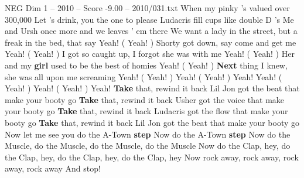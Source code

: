 \begin{textsample}{NEG Dim 1 – 2010 – Score -9.00 – 2010/031.txt}
When my pinky 's valued over 300,000 Let 's drink, you the one to please Ludacris fill cups like double D 's Me and Ursh once more and we leaves ' em there We want a lady in the street, but a freak in the bed, that say Yeah! ( Yeah! ) Shorty got down, say come and get me Yeah! ( Yeah! ) I got so caught up, I forgot she was with me Yeah! ( Yeah! ) Her and my \textbf{girl} used to be the best of homies Yeah! ( Yeah! ) \textbf{Next} thing I knew, she was all upon me screaming Yeah! ( Yeah! ) Yeah! ( Yeah! ) Yeah!
Yeah! ( Yeah! ) Yeah! ( Yeah! ) Yeah! \textbf{Take} that, rewind it back Lil Jon got the beat that make your booty go \textbf{Take} that, rewind it back Usher got the voice that make your booty go \textbf{Take} that, rewind it back Ludacris got the flow that make your booty go \textbf{Take} that, rewind it back Lil Jon got the beat that make your booty go Now let me see you do the A-Town \textbf{step} Now do the A-Town \textbf{step} Now do the Muscle, do the Muscle, do the Muscle, do the Muscle Now do the Clap, hey, do the Clap, hey, do the Clap, hey, do the Clap, hey Now rock away, rock away, rock away, rock away And stop!

\end{textsample}
